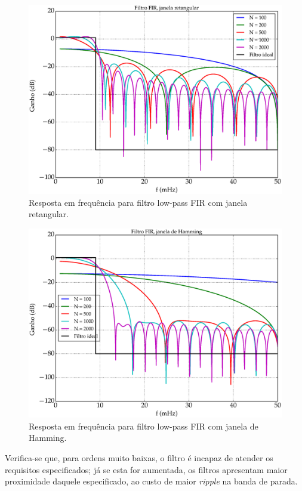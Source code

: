 \begin{figure}[H]
  \centering
  \includegraphics[scale=0.45]{images/plots/lowpass_FIR_rectangular_window}
  \caption{Resposta em frequência para filtro low-pass FIR com janela retangular.}
  \label{fig:lowpass_fir_rectang_response}
\end{figure}

\begin{figure}[H]
  \centering
  \includegraphics[scale=0.45]{images/plots/lowpass_FIR_hamming_window}
  \caption{Resposta em frequência para filtro low-pass FIR com janela de Hamming.}
  \label{fig:lowpass_fir_hamming_response}
\end{figure}

Verifica-se que, para ordens muito baixas, o filtro é incapaz de atender os requisitos especificados; já se esta for aumentada, os filtros apresentam maior proximidade daquele especificado, ao custo de maior \textit{ripple} na banda de parada.

